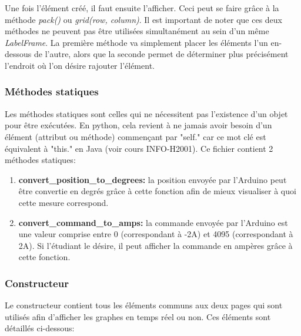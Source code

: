 Une fois l'élément créé, il faut ensuite l'afficher. Ceci peut se faire grâce à la méthode \textit{pack()} ou \textit{grid(row, column)}. Il est important de noter que ces deux méthodes ne peuvent pas être utilisées simultanément au sein d'un même \textit{LabelFrame}. La première méthode va simplement placer les éléments l'un en-dessous de l'autre, alors que la seconde permet de déterminer plus précisément l'endroit où l'on désire rajouter l'élément.

\subsubsection{Méthodes statiques}

Les méthodes statiques sont celles qui ne nécessitent pas l'existence d'un objet pour être exécutées. En python, cela revient à ne jamais avoir besoin d'un élément (attribut ou méthode) commençant par "self." car ce mot clé est équivalent à "this." en Java (voir cours INFO-H2001). Ce fichier contient 2 méthodes statiques:
\begin{enumerate}
    \item \textbf{convert\_position\_to\_degrees:} la position envoyée par l'Arduino peut être convertie en degrés grâce à cette fonction afin de mieux visualiser à quoi cette mesure correspond.
    \item \textbf{convert\_command\_to\_amps:} la commande envoyée par l'Arduino est une valeur comprise entre 0 (correspondant à -2A) et 4095 (correspondant à 2A). Si l'étudiant le désire, il peut afficher la commande en ampères grâce à cette fonction.
\end{enumerate}

\subsubsection{Constructeur}

Le constructeur contient tous les éléments communs aux deux pages qui sont utilisés afin d'afficher les graphes en temps réel ou non. Ces éléments sont détaillés ci-dessous:


